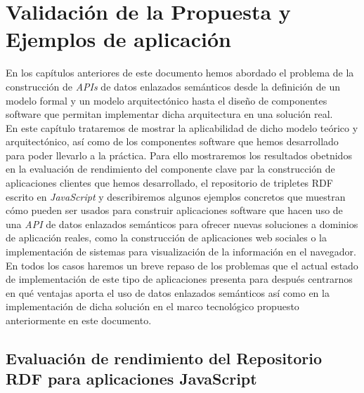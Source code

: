 \chapter{Validaci\'on de la Propuesta y Ejemplos de aplicaci\'on}

En los cap\'itulos anteriores de este documento hemos abordado el problema de la construcci\'on de \textit{APIs} de datos enlazados sem\'anticos desde la definici\'on de un modelo formal y un modelo arquitect\'onico hasta el dise\~no de componentes software que permitan implementar dicha arquitectura en una soluci\'on real.\\
En este cap\'itulo trataremos de mostrar la aplicabilidad de dicho modelo te\'orico y arquitect\'onico, as\'i como de los componentes software que hemos desarrollado para poder llevarlo a la pr\'actica. Para ello mostraremos los resultados obetnidos en la evaluaci\'on de rendimiento del componente clave par la construcci\'on de aplicaciones clientes que hemos desarrollado, el repositorio de tripletes RDF escrito en \textit{JavaScript}  y describiremos algunos ejemplos concretos que muestran c\'omo pueden ser usados para construir aplicaciones software que hacen uso de una \textit{API} de datos enlazados sem\'anticos para ofrecer nuevas soluciones a dominios de aplicaci\'on reales, como la construcci\'on de aplicaciones web sociales o la implementaci\'on de sistemas para visualizaci\'on de la informaci\'on en el navegador.\\
En todos los casos haremos un breve repaso de los problemas que el actual estado de implementaci\'on de este tipo de aplicaciones presenta para despu\'es centrarnos en qu\'e ventajas aporta el uso de datos enlazados sem\'anticos as\'i como en la implementaci\'on de dicha soluci\'on en el marco tecnol\'ogico propuesto anteriormente en este documento.

\section{Evaluaci\'on de rendimiento del Repositorio RDF para aplicaciones JavaScript}

